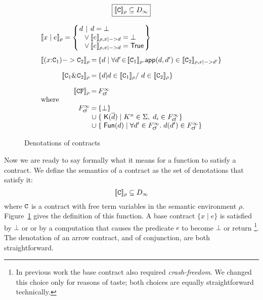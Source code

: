 \begin{figure}
$$
\setlength{\arraycolsep}{1pt}
\begin{array}{rcl}
\multicolumn{3}{c}{
\ruleform{\dbrace{\Ct}_{\rho} \subseteq D_{\infty}} }
\\ \\
\multicolumn{3}{l}{
\dbrace{x \mid e}_\rho
  =  \left\{ \begin{array}{rcl} d & \mid & \unroll{d} = \bot \\
              & \lor & \unroll{\dbrace{e}_{\rho,x|->d}} = \bot \\
              & \lor & \unroll{\dbrace{e}_{\rho,x|->d}} = \ret{\injKZ{True}}
             \end{array} \right\}
}
\\[2em]
\dbrace{(x{:}\Ct_1) -> \Ct_2}_{\rho}
 & = & \{ d \mid
           \forall d' \!\in\! \dbrace{\Ct_1}_\rho.
           \dapp(d,d') \in \dbrace{\Ct_2}_{\rho,x|->d'}
           \}
\\[1em]
\dbrace{\Ct_1 \& \Ct_2}_\rho
 & = & \{ d | d \in \dbrace{\Ct_1}_\rho /\ d \in \dbrace{\Ct_2}_\rho \}
\\[1em]
\dbrace{\CF}_\rho & = &  \Fcf^{\infty}  \\
\multicolumn{3}{l}{\text{where}} \\
   F_{\lcfZ}^{\infty} & = & \{ \bot \} \\
                   & \cup & \{\;\injK{K}{\ol{d}} \mid K^n \in \Sigma,\; d_i \in F_{\lcfZ}^{\infty} \} \\
                   & \cup & \{\;\injFun{d} \mid \forall d' \in F_{\lcfZ}^{\infty}.\; d(d') \in F_{\lcfZ}^{\infty} \}
\end{array}
$$
\caption{Denotations of contracts} \label{f:den-sem-contracts}
\end{figure}

Now we are ready to say formally what it means for a function to satisfy a contract.
We define the semantics of a contract as the set of denotations that satisfy it:
\[              [\![{\tt C}]\!]_\rho \subseteq D_\infty  \]
where ${\tt C}$ is a contract with free term variables in the semantic environment $\rho$.
Figure~\ref{f:den-sem-contracts} gives the definition of this function.
A base contract $\{x \mid e\}$ is satisfied by $\bot$ or
or by a computation that causes the predicate $e$ to become $\bot$
or return \True\footnote{
In previous
work \cite{xu+:contracts} the base contract also
required {\em crash-freedom}.
We changed this choice only for reasons of taste; both choices
are equally straightforward technically.}.
The denotation of an arrow contract, and of conjunction, are both straightforward.


